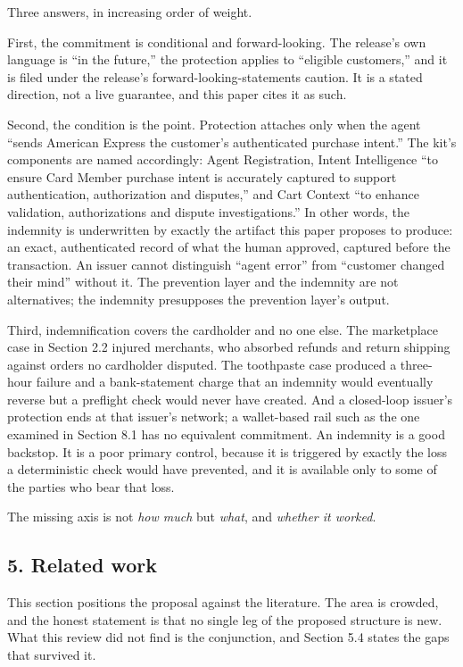 \documentclass[
  11pt,
  letterpaper,
]{article}
\begin{document}
Three answers, in increasing order of weight.

First, the commitment is conditional and forward-looking. The release's
own language is ``in the future,'' the protection applies to ``eligible
customers,'' and it is filed under the release's
forward-looking-statements caution. It is a stated direction, not a live
guarantee, and this paper cites it as such.

Second, the condition is the point. Protection attaches only when the
agent ``sends American Express the customer's authenticated purchase
intent.'' The kit's components are named accordingly: Agent
Registration, Intent Intelligence ``to ensure Card Member purchase
intent is accurately captured to support authentication, authorization
and disputes,'' and Cart Context ``to enhance validation, authorizations
and dispute investigations.'' In other words, the indemnity is
underwritten by exactly the artifact this paper proposes to produce: an
exact, authenticated record of what the human approved, captured before
the transaction. An issuer cannot distinguish ``agent error'' from
``customer changed their mind'' without it. The prevention layer and the
indemnity are not alternatives; the indemnity presupposes the prevention
layer's output.

Third, indemnification covers the cardholder and no one else. The
marketplace case in Section 2.2 injured merchants, who absorbed refunds
and return shipping against orders no cardholder disputed. The
toothpaste case produced a three-hour failure and a bank-statement
charge that an indemnity would eventually reverse but a preflight check
would never have created. And a closed-loop issuer's protection ends at
that issuer's network; a wallet-based rail such as the one examined in
Section 8.1 has no equivalent commitment. An indemnity is a good
backstop. It is a poor primary control, because it is triggered by
exactly the loss a deterministic check would have prevented, and it is
available only to some of the parties who bear that loss.

The missing axis is not \emph{how much} but \emph{what}, and
\emph{whether it worked}.

\subsection{5. Related work}\label{related-work}

This section positions the proposal against the literature. The area is
crowded, and the honest statement is that no single leg of the proposed
structure is new. What this review did not find is the conjunction, and
Section 5.4 states the gaps that survived it.
\end{document}
